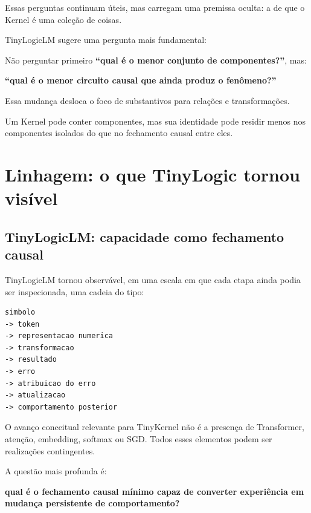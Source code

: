 \documentclass[11pt,a4paper]{article}
\begin{document}
Essas perguntas continuam úteis, mas carregam uma premissa oculta: a de que o Kernel
é uma coleção de coisas.

TinyLogicLM sugere uma pergunta mais fundamental:

\begin{thesisbox}
Não perguntar primeiro \textbf{“qual é o menor conjunto de componentes?”}, mas:

\begin{center}
\Large\bfseries
“qual é o menor circuito causal que ainda produz o fenômeno?”
\end{center}
\end{thesisbox}

Essa mudança desloca o foco de substantivos para relações e transformações.

Um Kernel pode conter componentes, mas sua identidade pode residir menos nos
componentes isolados do que no fechamento causal entre eles.

\section{Linhagem: o que TinyLogic tornou visível}

\subsection{TinyLogicLM: capacidade como fechamento causal}

TinyLogicLM tornou observável, em uma escala em que cada etapa ainda podia ser
inspecionada, uma cadeia do tipo:

\begin{lstlisting}
simbolo
-> token
-> representacao numerica
-> transformacao
-> resultado
-> erro
-> atribuicao do erro
-> atualizacao
-> comportamento posterior
\end{lstlisting}

O avanço conceitual relevante para TinyKernel não é a presença de Transformer,
atenção, embedding, softmax ou SGD. Todos esses elementos podem ser realizações
contingentes.

A questão mais profunda é:

\begin{center}
\textbf{qual é o fechamento causal mínimo capaz de converter experiência em mudança
persistente de comportamento?}
\end{center}
\end{document}
